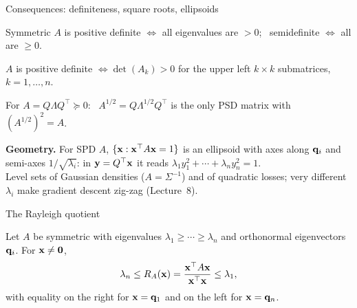 \documentclass[aspectratio=1610,11pt]{beamer}
\begin{document}
\begin{frame}{Consequences: definiteness, square roots, ellipsoids}
    \small
    \begin{corollary}
        Symmetric $A$ is positive definite $\iff$ all eigenvalues are $> 0$; \ semidefinite $\iff$ all are $\geq 0$.
    \end{corollary}
    \begin{corollary}
        $A$ is positive definite $\iff \det(A_k) > 0$ for the upper left $k \times k$ submatrices, $k = 1, \ldots, n$.
    \end{corollary}
    \begin{proposition}
        For $A = Q\Lambda Q^\top \succeq 0$: \ $A^{1/2} = Q\Lambda^{1/2}Q^\top$ is the only PSD matrix with $(A^{1/2})^2 = A$.
    \end{proposition}
    \textbf{Geometry.} For SPD $A$, $\{\mathbf{x} : \mathbf{x}^\top A\mathbf{x} = 1\}$ is an ellipsoid with axes along $\mathbf{q}_i$ and semi-axes $1/\sqrt{\lambda_i}$: in $\mathbf{y} = Q^\top\mathbf{x}$ it reads $\lambda_1y_1^2 + \cdots + \lambda_ny_n^2 = 1$.\\
    \textcolor{mlcolor}{Level sets of Gaussian densities ($A = \Sigma^{-1}$) and of quadratic losses; very different $\lambda_i$ make gradient descent zig-zag (Lecture~8).}
\end{frame}

\begin{frame}{The Rayleigh quotient}
    \begin{proposition}
        Let $A$ be symmetric with eigenvalues $\lambda_1 \geq \cdots \geq \lambda_n$ and orthonormal eigenvectors $\mathbf{q}_i$. For $\mathbf{x} \neq \mathbf{0}$,
        \[\lambda_n \leq R_A(\mathbf{x}) = \frac{\mathbf{x}^\top A\mathbf{x}}{\mathbf{x}^\top\mathbf{x}} \leq \lambda_1,\]
        with equality on the right for $\mathbf{x} = \mathbf{q}_1$ and on the left for $\mathbf{x} = \mathbf{q}_n$.
    \end{proposition}
    \centering{}
\end{frame}
\end{document}
